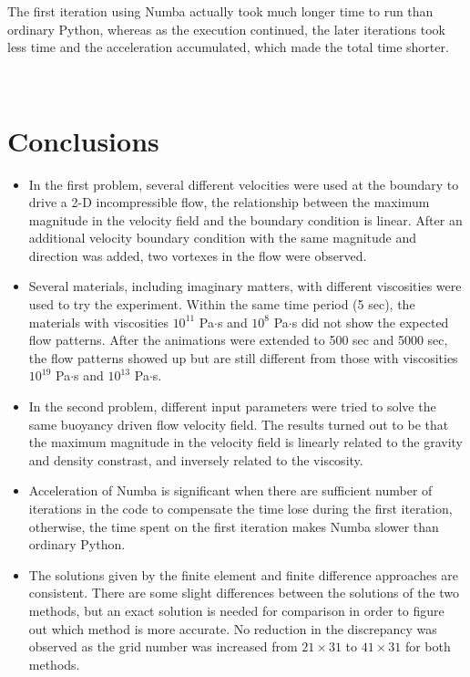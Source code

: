 \documentclass[12pt]{article}
\numberwithin{figure}{section}  %
\numberwithin{equation}{section}  %
\begin{document}
\begin{multicols}{2}
The first iteration using Numba actually took much longer time to run than ordinary Python, whereas as the execution continued, the later iterations took less time and the acceleration accumulated, which made the total time shorter.

~\\

\section{Conclusions}

\begin{itemize}
	\item{In the first problem, several different velocities were used at the boundary to drive a 2-D incompressible flow, the relationship between the maximum magnitude in the velocity field and the boundary condition is linear. After an additional velocity boundary condition with the same magnitude and direction was added, two vortexes in the flow were observed.}
	\item{Several materials, including imaginary matters, with different viscosities were used to try the experiment. Within the same time period (5 sec), the materials with viscosities $10^{11}$ Pa$\cdot$s and $10^8$ Pa$\cdot$s did not show the expected flow patterns. After the animations were extended to 500 sec and 5000 sec, the flow patterns showed up but are still different from those with viscosities $10^{19}$ Pa$\cdot$s and $10^{13}$ Pa$\cdot$s.}
	\item{In the second problem, different input parameters were tried to solve the same buoyancy driven flow velocity field. The results turned out to be that the maximum magnitude in the velocity field is linearly related to the gravity and density constrast, and inversely related to the viscosity.}
	\item{Acceleration of Numba is significant when there are sufficient number of iterations in the code to compensate the time lose during the first iteration, otherwise, the time spent on the first iteration makes Numba slower than ordinary Python.}
	\item{The solutions given by the finite element and finite difference approaches are consistent. There are some slight differences between the solutions of the two methods, but an exact solution is needed for comparison in order to figure out which method is more accurate. No reduction in the discrepancy was observed as the grid number was increased from $21\times31$ to $41\times31$ for both methods.}
\end{itemize}

~\\




\end{multicols}
\end{document}
